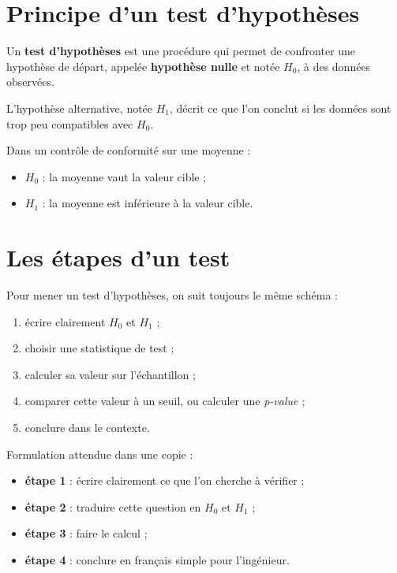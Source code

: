\section{Principe d'un test d'hypothèses}

\begin{Def}
Un \textbf{test d'hypothèses} est une procédure qui permet de confronter une hypothèse de départ, appelée \textbf{hypothèse nulle} et notée $H_0$, à des données observées.
\end{Def}

\begin{Def}
L'hypothèse alternative, notée $H_1$, décrit ce que l'on conclut si les données sont trop peu compatibles avec $H_0$.
\end{Def}

\begin{Ex}
Dans un contrôle de conformité sur une moyenne :
\begin{itemize}
    \item $H_0$ : la moyenne vaut la valeur cible ;
    \item $H_1$ : la moyenne est inférieure à la valeur cible.
\end{itemize}
\end{Ex}

\section{Les étapes d'un test}

\begin{Meth}
Pour mener un test d'hypothèses, on suit toujours le même schéma :
\begin{enumerate}
    \item écrire clairement $H_0$ et $H_1$ ;
    \item choisir une statistique de test ;
    \item calculer sa valeur sur l'échantillon ;
    \item comparer cette valeur à un seuil, ou calculer une \textit{p-value} ;
    \item conclure dans le contexte.
\end{enumerate}
\end{Meth}

\begin{Meth}
Formulation attendue dans une copie :
\begin{itemize}
    \item \textbf{étape 1} : écrire clairement ce que l'on cherche à vérifier ;
    \item \textbf{étape 2} : traduire cette question en $H_0$ et $H_1$ ;
    \item \textbf{étape 3} : faire le calcul ;
    \item \textbf{étape 4} : conclure en français simple pour l'ingénieur.
\end{itemize}
\end{Meth}

